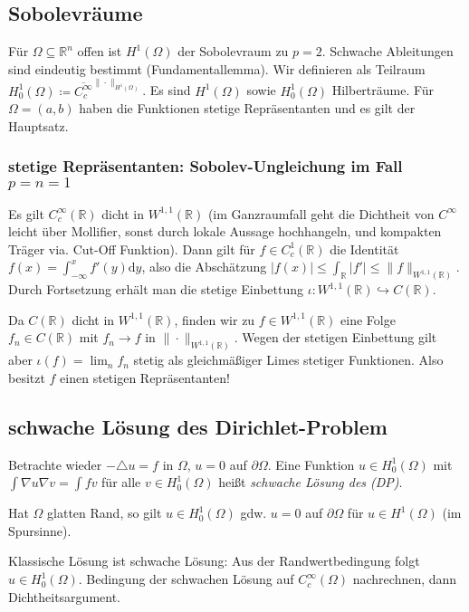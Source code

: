\documentclass[11pt,a4paper]{scrartcl}
\newcommand{\R}{\mathbb{R}} %
\newcommand{\norm}[1]{\|#1\|}
\newcommand{\laplace}{\triangle}
\theoremstyle{plain}
\theoremstyle{definition}
\theoremstyle{remark}
\begin{document}
\subsection{Sobolevräume}

Für $\Omega \subseteq \R^n$ offen ist $H^1(\Omega)$ der Sobolevraum zu $p=2$. Schwache Ableitungen sind eindeutig bestimmt (Fundamentallemma). Wir definieren als Teilraum $H^1_0(\Omega)\coloneqq \overline{C_c^\infty}^{\norm{\cdot}_{H^1(\Omega)}}$. Es sind $H^1(\Omega)$ sowie $H^1_0(\Omega)$ Hilberträume. Für $\Omega=(a,b)$ haben die Funktionen stetige Repräsentanten und es gilt der Hauptsatz.

\subsubsection{stetige Repräsentanten: Sobolev-Ungleichung im Fall $p=n=1$}

Es gilt $C_c^\infty(\R)$ dicht in $W^{1,1}(\R)$ (im Ganzraumfall geht die Dichtheit von $C^\infty$ leicht über Mollifier, sonst durch lokale Aussage hochhangeln, und kompakten Träger via. Cut-Off Funktion). Dann gilt für $f\in C_c^1(\R)$ die Identität $f(x)=\int_{-\infty}^x f'(y) \mathrm{d}y$, also die Abschätzung $|f(x)|\leq \int_\R |f'| \leq \|f\|_{W^{1,1}(\R)}$. Durch Fortsetzung erhält man die stetige Einbettung $\iota: W^{1,1}(\R)\hookrightarrow C(\R)$.

Da $C(\R)$ dicht in $W^{1,1}(\R)$, finden wir zu $f\in W^{1,1}(\R)$ eine Folge $f_n\in C(\R)$ mit $f_n\to f$ in $\|\cdot\|_{W^{1,1}(\R)}$. Wegen der stetigen Einbettung gilt aber $\iota(f)=\lim_n f_n$ stetig als gleichmäßiger Limes stetiger Funktionen. Also besitzt $f$ einen stetigen Repräsentanten!

\subsection{schwache Lösung des Dirichlet-Problem}

Betrachte wieder $-\laplace u = f$ in $\Omega$, $u=0$ auf $\partial\Omega$. Eine Funktion $u\in H^1_0(\Omega)$ mit $\int \nabla u \nabla v = \int fv$ für alle $v\in H^1_0(\Omega)$ heißt \emph{schwache Lösung des (DP)}. 

Hat $\Omega$ glatten Rand, so gilt $u\in H^1_0(\Omega)$ gdw. $u=0$ auf $\partial\Omega$ für $u\in H^1(\Omega)$ (im Spursinne).

Klassische Lösung ist schwache Lösung: Aus der Randwertbedingung folgt $u\in H^1_0(\Omega)$. Bedingung der schwachen Lösung auf $C_c^\infty(\Omega)$ nachrechnen, dann Dichtheitsargument.
\end{document}
